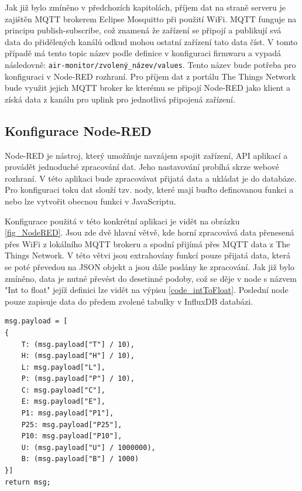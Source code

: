 Jak již bylo zmíněno v předchozích kapitolách, příjem dat na straně serveru je zajištěn MQTT brokerem Eclipse Mosquitto při použití WiFi. MQTT funguje na principu publish-subscribe, což znamená že zařízení se připojí a publikují svá data do přidělených kanálů odkud mohou ostatní zařízení tato data číst. V tomto případě má tento topic název podle definice v konfiguraci firmwaru a vypadá následovně: \lstinline{air-monitor/zvolený_název/values}. Tento název bude potřeba pro konfiguraci v Node-RED rozhraní. Pro příjem dat z portálu The Things Network bude využit jejich MQTT broker ke kterému se připojí Node-RED jako klient a získá data z kanálu pro uplink pro jednotlivá připojená zařízení.

\subsection{Konfigurace Node-RED}

Node-RED je nástroj, který umožňuje navzájem spojit zařízení, API aplikací a provádět jednoduché zpracování dat. Jeho nastavování probíhá skrze webové rozhraní. V této aplikaci bude zpracovávat přijatá data a ukládat je do databáze. Pro konfiguraci toku dat slouží tzv. nody, které mají buďto definovanou funkci a nebo lze vytvořit obecnou funkci v JavaScriptu.

Konfigurace použitá v této konkrétní aplikaci je vidět na obrázku \ref{fig_NodeRED}. Jsou zde dvě hlavní větvě, kde horní zpracovává data přenesená přes WiFi z lokálního MQTT brokeru a spodní přijímá přes MQTT data z The Things Network. V této větvi jsou extrahovány funkcí pouze přijatá data, která se poté převedou na JSON objekt a jsou dále poslány ke zpracování. Jak již bylo zmíněno, data je nutné převést do desetinné podoby, což se děje v node s názvem "Int to float" jejíž definici lze vidět na výpisu \ref{code_intToFloat}. Poslední node pouze zapisuje data do předem zvolené tabulky v InfluxDB databázi.

\begin{lstlisting}[caption={Funkce pro převod naměřených dat do desetinné podoby.}, label={code_intToFloat}]
msg.payload = [
{
    T: (msg.payload["T"] / 10),
    H: (msg.payload["H"] / 10),
    L: msg.payload["L"],
    P: (msg.payload["P"] / 10),
    C: msg.payload["C"],
    E: msg.payload["E"],
    P1: msg.payload["P1"],
    P25: msg.payload["P25"],
    P10: msg.payload["P10"],
    U: (msg.payload["U"] / 1000000),
    B: (msg.payload["B"] / 1000)
}]
return msg;
\end{lstlisting}

